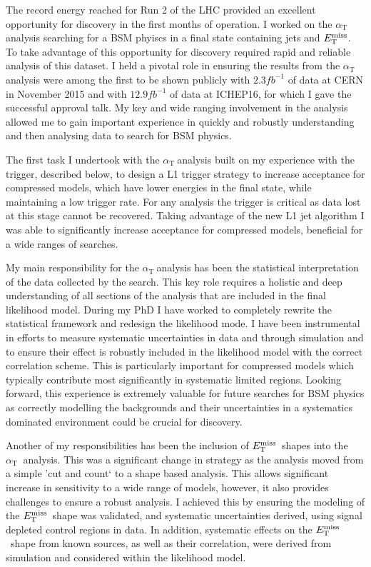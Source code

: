 \documentclass[11pt]{article}
\theoremstyle{plain} \numberwithin{equation}{section}
\theoremstyle{definition}
\DeclareRobustCommand{\alphat}{$\alpha_{\text{T}}~$}
\DeclareRobustCommand{\met}{$\mbox{$E_\text{T}^{\rm miss}$}\xspace$}
\newcounter{list}
\begin{document}
The record energy reached for Run 2 of the LHC provided an excellent opportunity for discovery
in the first months of operation. I worked on the \alphat analysis searching for a BSM phyiscs in a 
final state containing jets and \met. 
To take advantage of this opportunity for discovery required rapid and reliable analysis of this dataset. 
I held a pivotal role in ensuring the results from the \alphat analysis were among the 
first to be shown publicly with $2.3{fb}^{-1}$ of data at CERN in November 2015
and with $12.9{fb}^{-1}$ of data at ICHEP16, for which I gave the successful
approval talk. My key and wide ranging involvement in the analysis allowed me to gain important experience 
in quickly and robustly understanding and then analysing data to search for BSM physics. 

The first task I undertook with the \alphat analysis built on my experience with the 
trigger, described below, to design a L1 trigger strategy to increase acceptance for compressed models,
which have lower energies in the final state, while maintaining a low trigger rate. 
For any analysis the trigger is critical as data lost at this stage cannot be recovered. 
Taking advantage of the new L1 jet algorithm I was able to significantly increase 
acceptance for compressed models, beneficial for a wide ranges of searches.

My main responsibility for the \alphat analysis has been the statistical interpretation
of the data collected by the search. This key role requires a holistic and deep understanding
of all sections of the analysis that are included in the final likelihood model. During my
PhD I have worked to completely rewrite the statistical framework and redesign the likelihood mode. 
I have been instrumental in efforts to measure systematic uncertainties in data and through simulation and to
ensure their effect is robustly included in the likelihood 
model with the correct correlation scheme. This is particularly important for compressed models which typically
contribute most significantly in systematic limited regions. Looking forward, this experience is extremely valuable 
for future searches for BSM physics as correctly modelling the backgrounds and their uncertainties in a systematics 
dominated environment could be crucial for discovery.

Another of my responsibilities has been the inclusion of \met~shapes into the \alphat
analysis. This was a significant change in strategy as the analysis moved from a simple 'cut and
count` to a shape based analysis. This allows significant increase in sensitivity to a wide 
range of models, however, it also provides challenges to ensure a robust analysis. I achieved this
by ensuring the modeling of the \met~shape was validated, and systematic uncertainties derived, 
using signal depleted control regions in data. In addition, systematic effects on the \met~shape from known sources,
as well as their correlation, were derived from simulation and considered within the likelihood model.
\end{document}
